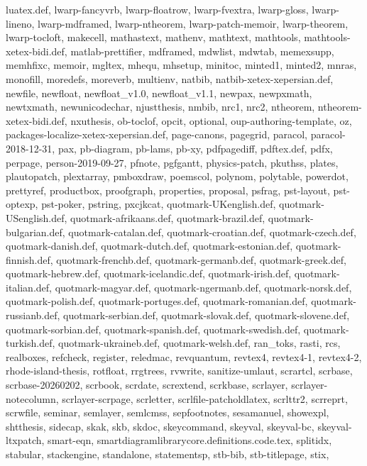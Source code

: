 \documentclass{l3in2edoc}
\begin{document}
{  luatex.def, lwarp-fancyvrb, lwarp-floatrow, lwarp-fvextra,
  lwarp-gloss, lwarp-lineno, lwarp-mdframed, lwarp-ntheorem,
  lwarp-patch-memoir, lwarp-theorem, lwarp-tocloft, makecell,
  mathastext, mathenv, mathtext, mathtools, mathtools-xetex-bidi.def,
  matlab-prettifier, mdframed, mdwlist, mdwtab, memexsupp, memhfixc,
  memoir, mgltex, mhequ, mhsetup, minitoc, minted1, minted2, mnras,
  monofill, moredefs, moreverb, multienv, natbib,
  natbib-xetex-xepersian.def, newfile, newfloat, newfloat\_v1.0,
  newfloat\_v1.1, newpax, newpxmath, newtxmath, newunicodechar,
  njustthesis, nmbib, nrc1, nrc2, ntheorem, ntheorem-xetex-bidi.def,
  nxuthesis, ob-toclof, opcit, optional, oup-authoring-template, oz,
  packages-localize-xetex-xepersian.def, page-canons, pagegrid, paracol,
  paracol-2018-12-31, pax, pb-diagram, pb-lams, pb-xy, pdfpagediff,
  pdftex.def, pdfx, perpage, person-2019-09-27, pfnote, pgfgantt,
  physics-patch, pkuthss, plates, plautopatch, plextarray, pmboxdraw,
  poemscol, polynom, polytable, powerdot, prettyref, productbox,
  proofgraph, properties, proposal, psfrag, pst-layout, pst-optexp,
  pst-poker, pstring, pxcjkcat, quotmark-UKenglish.def,
  quotmark-USenglish.def, quotmark-afrikaans.def, quotmark-brazil.def,
  quotmark-bulgarian.def, quotmark-catalan.def, quotmark-croatian.def,
  quotmark-czech.def, quotmark-danish.def, quotmark-dutch.def,
  quotmark-estonian.def, quotmark-finnish.def, quotmark-frenchb.def,
  quotmark-germanb.def, quotmark-greek.def, quotmark-hebrew.def,
  quotmark-icelandic.def, quotmark-irish.def, quotmark-italian.def,
  quotmark-magyar.def, quotmark-ngermanb.def, quotmark-norsk.def,
  quotmark-polish.def, quotmark-portuges.def, quotmark-romanian.def,
  quotmark-russianb.def, quotmark-serbian.def, quotmark-slovak.def,
  quotmark-slovene.def, quotmark-sorbian.def, quotmark-spanish.def,
  quotmark-swedish.def, quotmark-turkish.def, quotmark-ukraineb.def,
  quotmark-welsh.def, ran\_toks, rasti, rcs, realboxes, refcheck,
  register, reledmac, revquantum, revtex4, revtex4-1, revtex4-2,
  rhode-island-thesis, rotfloat, rrgtrees, rvwrite, sanitize-umlaut,
  scrartcl, scrbase, scrbase-20260202, scrbook, scrdate, scrextend,
  scrkbase, scrlayer, scrlayer-notecolumn, scrlayer-scrpage, scrletter,
  scrlfile-patcholdlatex, scrlttr2, scrreprt, scrwfile, seminar,
  semlayer, semlcmss, sepfootnotes, sesamanuel, showexpl, shtthesis,
  sidecap, skak, skb, skdoc, skeycommand, skeyval, skeyval-bc,
  skeyval-ltxpatch, smart-eqn,
  smartdiagramlibrarycore.definitions.code.tex, splitidx, stabular,
  stackengine, standalone, statementsp, stb-bib, stb-titlepage, stix,
}
\end{document}

